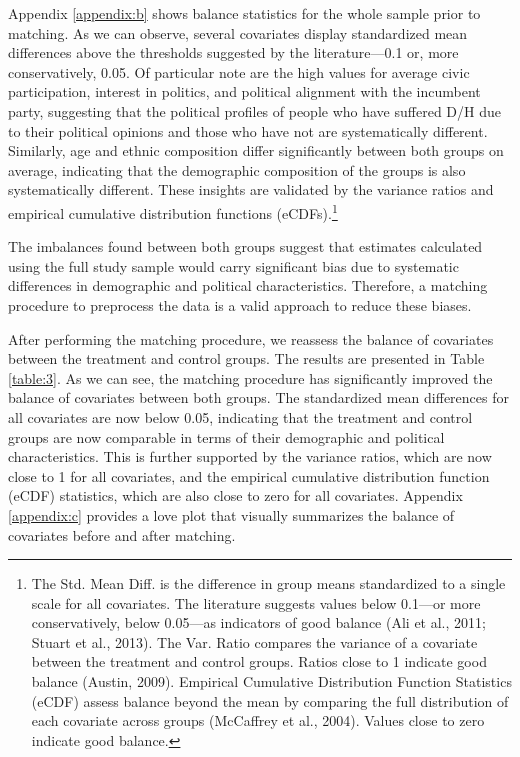 \documentclass{article}
\begin{document}
Appendix \ref{appendix:b} shows balance statistics for the whole sample prior to matching. As we can observe, several covariates display standardized mean differences above the thresholds suggested by the literature—0.1 or, more conservatively, 0.05. Of particular note are the high values for average civic participation, interest in politics, and political alignment with the incumbent party, suggesting that the political profiles of people who have suffered D/H due to their political opinions and those who have not are systematically different. Similarly, age and ethnic composition differ significantly between both groups on average, indicating that the demographic composition of the groups is also systematically different. These insights are validated by the variance ratios and empirical cumulative distribution functions (eCDFs).\footnote{The Std. Mean Diff. is the difference in group means standardized to a single scale for all covariates. The literature suggests values below 0.1—or more conservatively, below 0.05—as indicators of good balance (Ali et al., 2011; Stuart et al., 2013). The Var. Ratio compares the variance of a covariate between the treatment and control groups. Ratios close to 1 indicate good balance (Austin, 2009). Empirical Cumulative Distribution Function Statistics (eCDF) assess balance beyond the mean by comparing the full distribution of each covariate across groups (McCaffrey et al., 2004). Values close to zero indicate good balance.}

The imbalances found between both groups suggest that estimates calculated using the full study sample would carry significant bias due to systematic differences in demographic and political characteristics. Therefore, a matching procedure to preprocess the data is a valid approach to reduce these biases.

After performing the matching procedure, we reassess the balance of covariates between the treatment and control groups. The results are presented in Table \ref{table:3}. As we can see, the matching procedure has significantly improved the balance of covariates between both groups. The standardized mean differences for all covariates are now below 0.05, indicating that the treatment and control groups are now comparable in terms of their demographic and political characteristics. This is further supported by the variance ratios, which are now close to 1 for all covariates, and the empirical cumulative distribution function (eCDF) statistics, which are also close to zero for all covariates. Appendix \ref{appendix:c} provides a love plot that visually summarizes the balance of covariates before and after matching.
\end{document}
